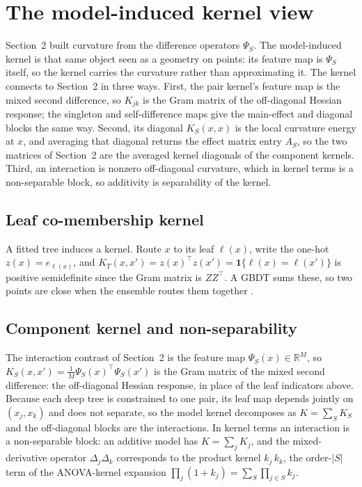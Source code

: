\documentclass[11pt]{article}
\newcommand{\D}{\Delta}
\begin{document}
\section{The model-induced kernel view}
\label{sec:kernel}

Section~2 built curvature from the difference operators $\Psi_S$. The
model-induced kernel is that same object seen as a geometry on points: its feature
map is $\Psi_S$ itself, so the kernel carries the curvature rather than
approximating it. The kernel connects to Section~2 in three ways. First, the pair kernel's feature map is the mixed second
difference, so $K_{jk}$ is the Gram matrix of the off-diagonal Hessian response;
the singleton and self-difference maps give the main-effect and diagonal blocks
the same way. Second, its diagonal $K_S(x,x)$ is the local curvature energy at
$x$, and averaging that diagonal returns the effect matrix entry $A_S$, so the two
matrices of Section~2 are the averaged kernel diagonals of the component kernels.
Third, an interaction is nonzero off-diagonal curvature, which in kernel terms is a
non-separable block, so additivity is separability of the kernel.

\subsection{Leaf co-membership kernel}

A fitted tree induces a kernel. Route $x$ to its leaf $\ell(x)$, write the one-hot
$z(x)=e_{\ell(x)}$, and $K_T(x,x')=z(x)^\top z(x')=\mathbf 1\{\ell(x)=\ell(x')\}$
is positive semidefinite since the Gram matrix is $ZZ^\top$. A GBDT sums these, so
two points are close when the ensemble routes them together
\cite{SudjiantoZhang2026}.

\subsection{Component kernel and non-separability}

The interaction contrast of Section~2 is the feature map $\Psi_S(x)\in\mathbb R^M$,
so $K_S(x,x')=\tfrac1M\Psi_S(x)^\top\Psi_S(x')$ is the Gram matrix of the mixed
second difference: the off-diagonal Hessian response, in place of the leaf
indicators above. Because each deep
tree is constrained to one pair, its leaf map depends jointly on $(x_j,x_k)$ and
does not separate, so the model kernel decomposes as $K=\sum_S K_S$ and the
off-diagonal blocks are the interactions. In kernel terms an interaction is a
non-separable block: an additive model has $K=\sum_j K_j$, and the mixed-derivative
operator $\D_j\D_k$ corresponds to the product kernel $k_j\,k_k$, the order-$|S|$
term of the ANOVA-kernel expansion $\prod_j(1+k_j)=\sum_S\prod_{j\in S}k_j$.
\end{document}
